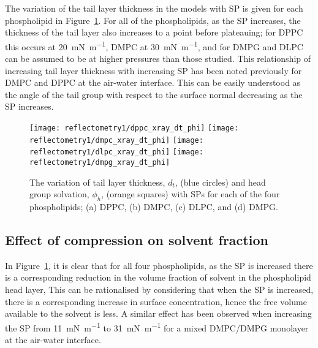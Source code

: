 The variation of the tail layer thickness in the models with SP is given for each phospholipid in Figure~\ref{fig:dtphi}.
For all of the phospholipids, as the SP increases, the thickness of the tail layer also increases to a point before plateauing; for DPPC this occurs at \SI{20}{\milli\newton\per\meter}, DMPC at \SI{30}{\milli\newton\per\meter}, and for DMPG and DLPC can be assumed to be at higher pressures than those studied.
This relationship of increasing tail layer thickness with increasing SP has been noted previously for DMPC\autocite{bayerl_specular_1990} and DPPC\autocite{campbell_structure_2018} at the air-water interface.
This can be easily understood as the angle of the tail group with respect to the surface normal decreasing as the SP increases.
%
\begin{figure}
\forcerectofloat
    \centering
    \texttt{[image: reflectometry1/dppc\_xray\_dt\_phi]}
    \texttt{[image: reflectometry1/dmpc\_xray\_dt\_phi]}
    \texttt{[image: reflectometry1/dlpc\_xray\_dt\_phi]}
    \texttt{[image: reflectometry1/dmpg\_xray\_dt\_phi]}
    \caption{The variation of tail layer thickness, $d_t$, (blue circles) and head group solvation, $\phi_h$, (orange squares) with SPs for each of the four phospholipids; (a) DPPC, (b) DMPC, (c) DLPC, and (d) DMPG.}
    \label{fig:dtphi}
\end{figure}
%

\subsection{Effect of compression on solvent fraction}
In Figure~\ref{fig:dtphi}, it is clear that for all four phospholipids, as the SP is increased there is a corresponding reduction in the volume fraction of solvent in the phospholipid head layer,
This can be rationalised by considering that when the SP is increased, there is a corresponding increase in surface concentration, hence the free volume available to the solvent is less.
A similar effect has been observed when increasing the SP from \SI{11}{\milli\newton\per\meter} to \SI{31}{\milli\newton\per\meter} for a mixed DMPC/DMPG monolayer at the air-water interface.\autocite{bayerl_specular_1990}

